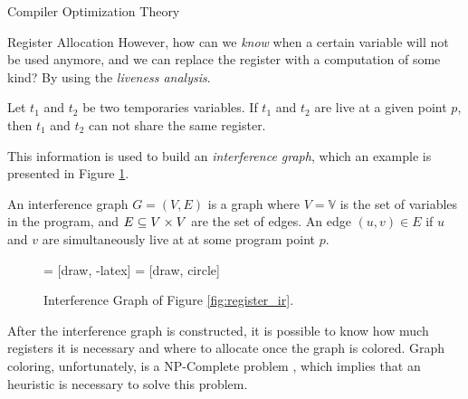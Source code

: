 \begin{section}{Compiler Optimization Theory}
\begin{subsection}{Register Allocation}
	However, how can we \textit{know} when a certain variable will not
	be used anymore, and we can replace the register with a computation
	of some kind? By using the \textit{liveness analysis}.

\begin{definition}
	Let $t_1$ and $t_2$ be two temporaries variables. If $t_1$ and
	$t_2$ are live at a given point $p$, then $t_1$ and $t_2$ can not
	share the same register.
\end{definition}

This information is used to build an \textit{interference graph}, which an
example is presented in Figure \ref{fig:interf_graph}.

\begin{definition}
	An interference graph $G = (V, E)$ is a graph where $V = \mathbb{V}$ is the
	set of variables in the program, and $E \subseteq V \times V$ are the set of
	edges. An edge $(u, v) \in E$ if $u$ and $v$ are simultaneously live at
	at some program point $p$.
\end{definition}

\begin{figure}
     = [draw, -latex]
     = [draw, circle]
    \begin{center}
    \end{center}
	  \caption{Interference Graph of Figure \ref{fig:register_ir}.}
	  \label{fig:interf_graph}
\end{figure}

After the interference graph is constructed, it is possible to know how
much registers it is necessary and where to allocate once the graph is colored.
Graph coloring, unfortunately, is a NP-Complete problem
\citep{karp1972reducibility}, which implies that an heuristic is necessary to
solve this problem.


\end{subsection}
\end{section}
